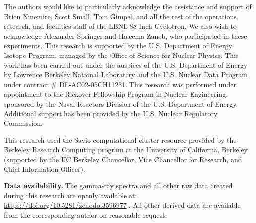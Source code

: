 \documentclass[onecolumn,epjc3]{svjour3}
\begin{document}
\begin{acknowledgements}
 
 
The authors would like to particularly acknowledge the assistance and support of  Brien Ninemire, Scott Small, Tom Gimpel, and all the rest of the operations, research, and facilities staff of the LBNL 88-Inch Cyclotron.
We also wish to acknowledge Alexander  Springer and Haleema Zaneb, who participated in these experiments.
This research is supported by the U.S. Department of Energy Isotope Program, managed by the Office of Science for  Nuclear Physics.
This work has been carried out  under the auspices of the U.S. Department of Energy by  Lawrence Berkeley National Laboratory and the U.S. Nuclear Data Program under contract \# DE-AC02-05CH11231.
This research was performed under appointment to the Rickover Fellowship Program in Nuclear Engineering, sponsored by the Naval Reactors Division of the U.S. Department of Energy.
Additional support has been provided by the U.S. Nuclear Regulatory Commission.




 
This research used the Savio computational cluster resource provided by the Berkeley Research Computing program at the University of California, Berkeley (supported by the UC Berkeley Chancellor, Vice Chancellor for Research, and Chief Information Officer).

\end{acknowledgements}




{\small \textbf{Data availability.} The gamma-ray spectra and all other raw data created during this research are openly available at: \url{https://doi.org/10.5281/zenodo.3596977} \cite{voyles_andrew_2020_3596977}. All other derived data  are available from the corresponding author on reasonable request.}
\end{document}
